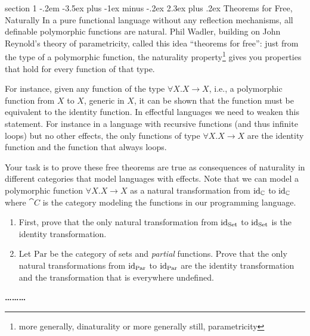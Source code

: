 \documentclass[12pt]{article}
\makeatletter
\newenvironment{problem}{\@startsection
       {section}
       {1}
       {-.2em}
       {-3.5ex plus -1ex minus -.2ex}
       {2.3ex plus .2ex}
       {\pagebreak[3]%
       \large\bf\noindent{Problem }
       }
       }
       {%
       \begin{center}\large\bf \ldots\ldots\ldots\end{center}}
\makeatother
\begin{document}
\begin{problem}{Theorems for Free, Naturally}
  In a pure functional language without any reflection mechanisms, all
  definable polymorphic functions are natural. Phil Wadler, building
  on John Reynold's theory of parametricity, called this idea
  ``theorems for free'': just from the type of a polymorphic function,
  the naturality property\footnote{more generally, dinaturality or
  more generally still, parametricity} gives you properties that hold
  for every function of that type\citep{reynolds83,
    wadler1989theorems}.

  For instance, given any function of the type $\forall X. X \to X$,
  i.e., a polymorphic function from $X$ to $X$, generic in $X$, it can
  be shown that the function must be equivalent to the identity
  function. In effectful languages we need to weaken this
  statement. For instance in a language with recursive functions (and
  thus infinite loops) but no other effects, the only functions of
  type $\forall X. X \to X$ are the identity function and the function
  that always loops.

  Your task is to prove these free theorems are true as consequences
  of naturality in different categories that model languages with
  effects. Note that we can model a polymorphic function $\forall X. X
  \to X$ as a natural transformation from $\textrm{id}_{\mathbb C}$ to $\textrm{id}_{\mathbb
    C}$ where $\cat C$ is the category modeling the functions in our
  programming language.
  \begin{enumerate}
  \item First, prove that the only natural transformation from
    $\textrm{id}_{\textrm{Set}}$ to $\textrm{id}_{\textrm{Set}}$ is the identity transformation.
  \item Let $\textrm{Par}$ be the category of sets and \emph{partial}
    functions. Prove that the only natural transformations from
    $\textrm{id}_{\textrm{Par}}$ to $\textrm{id}_{\textrm{Par}}$ are the identity
    transformation and the transformation that is everywhere
    undefined.
  \end{enumerate}
\end{problem}

\thispagestyle{empty}


\end{document}
